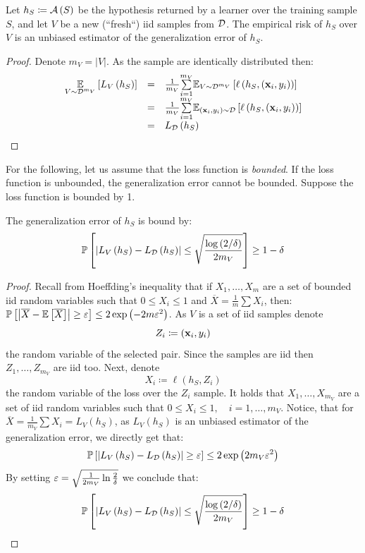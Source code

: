 \begin{claim}
Let $h_S\coloneqq\mathcal{A}\left(S\right)$ be the hypothesis returned by a learner over the training sample $S$, and let $V$ be a new (``fresh``) iid samples from $\mathcal{D}$. The empirical risk of $h_S$ over $V$ is an unbiased estimator of the generalization error of $h_S$.
\end{claim}
\begin{proof}
Denote $m_V=\left|V\right|$. As the sample are identically distributed then:
$$
\begin{array}{ccl}
\underset{{V\sim\mathcal{D}^{m_V}}}{\mathbb{E}} \left[L_V\left(h_S\right)\right] & = & \frac{1}{m_V}\overset{m_V}{\underset{i=1}{\sum}} \mathbb{E}_{V\sim\mathcal{D}^{m_V}}\left[\ell\left(h_S,\left(\mathbf{x}_i,y_i\right)\right)\right]  \\
& = & \frac{1}{m_V}\overset{m_V}{\underset{i=1}{\sum}} \mathbb{E}_{\left(\mathbf{x}_i,y_i\right)\sim\mathcal{D}}\left[\ell\left(h_S,\left(\mathbf{x}_i,y_i\right)\right)\right] \\
& = & L_{\mathcal{D}}\left(h_S\right)
\end{array}
$$
\end{proof}
For the following, let us assume that the loss function is \textit{bounded}. If the loss function is unbounded, the generalization error cannot be bounded. Suppose the loss function is bounded by 1.
\begin{corollary}
The generalization error of $h_S$ is bound by: $$ \mathbb{P}\left[\left|L_V\left(h_S\right)-L_{\mathcal{D}}\left(h_S\right)\right|\leq \sqrt{\frac{\log\left(2/\delta\right)}{2m_V}}\right] \geq 1-\delta $$
\end{corollary}
\begin{proof}
Recall from Hoeffding's inequality that if $X_1,\ldots,X_m$ are a set of bounded iid random variables such that $0\leq X_i\leq 1$ and $\overline{X}=\frac{1}{m}\sum X_i$, then: $\mathbb{P}\left[\left|\overline{X}-\mathbb{E}\left[\overline{X}\right]\right|\geq \varepsilon\right]\leq 2\exp\left(-2m\varepsilon^2\right)$. As $V$ is a set of iid samples denote $$Z_i\coloneqq \left(\mathbf{x}_i,y_i\right)$$ the random variable of the selected pair. Since the samples are iid then $Z_1,\ldots,Z_{m_V}$ are iid too. Next, denote $$ X_i\coloneqq \ell\left(h_S,Z_i\right) $$ the random variable of the loss over the $Z_i$ sample. It holds that $ X_1,\ldots,X_{m_V} $ are a set of iid random variables such that $0\leq X_i \leq 1,\quad i=1,\ldots,m_V$. Notice, that for $\overline{X}=\frac{1}{m_V}\sum X_i=L_V\left(h_S\right)$, as $L_V\left(h_S\right)$ is an unbiased estimator of the generalization error, we directly get that:
$$ \mathbb{P}\left[\left|L_V\left(h_S\right)-L_{\mathcal{D}}\left(h_S\right)\right|\geq \varepsilon \right] \leq 2\exp\left(2m_V\varepsilon^2\right) $$
By setting $\varepsilon=\sqrt{\frac{1}{2m_V}\ln\frac{2}{\delta}}$ we conclude that:
$$ \mathbb{P}\left[\left|L_V\left(h_S\right)-L_{\mathcal{D}}\left(h_S\right)\right|\leq \sqrt{\frac{\log\left(2/\delta\right)}{2m_V}}\right] \geq 1-\delta $$
\end{proof}

